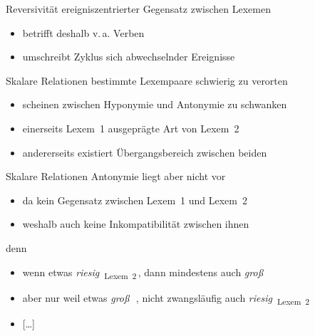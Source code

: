 \begin{frame}{Reversivität}
\onslide<+->
ereigniszentrierter Gegensatz zwischen Lexemen
\begin{itemize}[<+->]
	\item		betrifft deshalb v.\,a. Verben
	\item		umschreibt Zyklus sich abwechselnder Ereignisse
\end{itemize}
\onslide<+->
\Zeile
\begin{exe}
	\ex\label{ex:reversivitaet-001}
    \begin{xlist}
		\onslide<+->
	\end{xlist}
\end{exe}
\end{frame}

\begin{frame}{Skalare Relationen}
\onslide<+->
bestimmte Lexempaare schwierig zu verorten
\begin{itemize}[<+->]
	\item		scheinen zwischen Hyponymie und Antonymie zu schwanken
	\item		einerseits Lexem~1 ausgeprägte Art von Lexem~2
	\item		andererseits existiert Übergangsbereich zwischen beiden
\end{itemize}
\onslide<+->
\Zeile
\begin{exe}
	\ex\label{ex:skalare.relationen-001}
    \begin{xlist}
		\onslide<+->
		\onslide<+->
	\end{xlist}
\end{exe}
\end{frame}

\begin{frame}{Skalare Relationen}
\onslide<+->
Antonymie liegt aber nicht vor
\begin{itemize}[<+->]
	\item		da kein Gegensatz zwischen Lexem~1 und Lexem~2
	\item		weshalb auch keine Inkompatibilität zwischen ihnen
\end{itemize}
\onslide<+->
\Zeile
denn
\begin{itemize}[<+->]
	\item		wenn etwas \textit{riesig}~\textsubscript{\alert{Lexem~2}}\,, dann mindestens auch \textit{groß}~\textsubscript{}
	\item		aber nur weil etwas \textit{groß}~\textsubscript{}\,, nicht zwangsläufig auch \textit{riesig}~\textsubscript{\alert{Lexem~2}}
	\item		{[\ldots]}
\end{itemize}
\end{frame}


